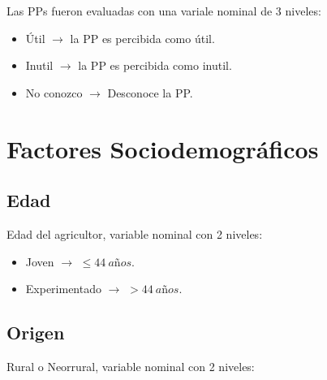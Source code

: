 \documentclass[a4paper, nobind]{templates/ociamthesis}
\providecommand{\tightlist}{%
  \setlength{\itemsep}{0pt}\setlength{\parskip}{0pt}}
\begin{document}
Las PPs fueron evaluadas con una variale nominal de 3 niveles:

\begin{itemize}
\tightlist
\item
  Útil \(\rightarrow\) la PP es percibida como útil.
\item
  Inutil \(\rightarrow\) la PP es percibida como inutil.
\item
  No conozco \(\rightarrow\) Desconoce la PP.
\end{itemize}

\hypertarget{factores-sociodemogruxe1ficos}{%
\section{Factores Sociodemográficos}\label{factores-sociodemogruxe1ficos}}

\hypertarget{edad}{%
\subsection{Edad}\label{edad}}

Edad del agricultor, variable nominal con 2 niveles:

\begin{itemize}
\tightlist
\item
  Joven \(\rightarrow\) \(\leq 44\ años\).
\item
  Experimentado \(\rightarrow\) \(> 44\ años\).
\end{itemize}

\hypertarget{origen}{%
\subsection{Origen}\label{origen}}

Rural o Neorrural, variable nominal con 2 niveles:
\end{document}
